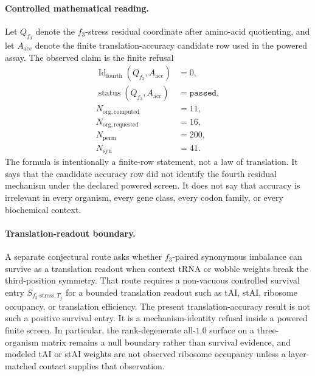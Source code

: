 \paragraph{Controlled mathematical reading.}
Let $Q_{f_3}$ denote the $f_3$-stress residual coordinate after amino-acid quotienting, and let $A_{\mathrm{acc}}$ denote the finite translation-accuracy candidate row used in the powered assay.  The observed claim is the finite refusal
$$
\begin{aligned}
\operatorname{Id}_{\mathrm{fourth}}(Q_{f_3},A_{\mathrm{acc}})&=0,\\
\operatorname{status}(Q_{f_3},A_{\mathrm{acc}})&=\texttt{passed},\\
N_{\mathrm{org,computed}}&=11,\\
N_{\mathrm{org,requested}}&=16,\\
N_{\mathrm{perm}}&=200,\\
N_{\mathrm{syn}}&=41.
\end{aligned}
$$
The formula is intentionally a finite-row statement, not a law of translation.  It says that the candidate accuracy row did not identify the fourth residual mechanism under the declared powered screen.  It does not say that accuracy is irrelevant in every organism, every gene class, every codon family, or every biochemical context.

\paragraph{Translation-readout boundary.}
A separate conjectural route asks whether $f_3$-paired synonymous imbalance can survive as a translation readout when context tRNA or wobble weights break the third-position symmetry.  That route requires a non-vacuous controlled survival entry $S_{f_3\text{-}\mathrm{stress},T_j}$ for a bounded translation readout such as tAI, stAI, ribosome occupancy, or translation efficiency.  The present translation-accuracy result is not such a positive survival entry.  It is a mechanism-identity refusal inside a powered finite screen.  In particular, the rank-degenerate all-$1.0$ surface on a three-organism matrix remains a null boundary rather than survival evidence, and modeled tAI or stAI weights are not observed ribosome occupancy unless a layer-matched contact supplies that observation.

